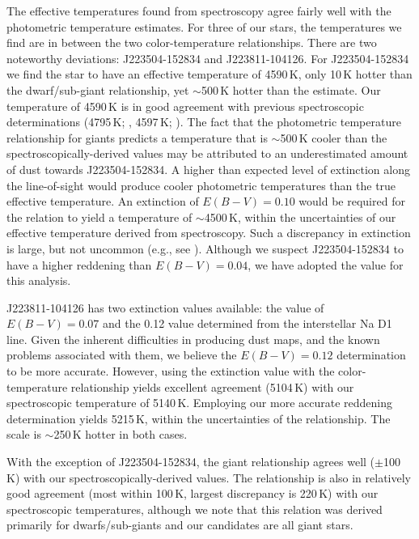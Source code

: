 \documentclass{emulateapj}
\begin{document}
The effective temperatures found from spectroscopy agree fairly well with the photometric temperature estimates. For three of our stars, the temperatures we find are in between the two color-temperature relationships. There are two noteworthy deviations: J223504-152834 and J223811-104126. For J223504-152834 we find the star to have an effective temperature of 4590\,K, only 10\,K hotter than the \citet{casagrande;et-al_2010} dwarf/sub-giant relationship, yet ${\sim}$500\,K hotter than the \citet{alonso;et-al_1999} estimate. Our temperature of 4590\,K is in good agreement with previous spectroscopic determinations (4795\,K; \citet{williams;et-al_2011}, 4597\,K; \citet{wylie-de-boer;et-al_2012}). The fact that the \citet{alonso;et-al_1999} photometric temperature relationship for giants predicts a temperature that is ${\sim}$500\,K cooler than the spectroscopically-derived values may be attributed to an underestimated amount of dust towards J223504-152834. A higher than expected level of extinction along the line-of-sight would produce cooler photometric temperatures than the true effective temperature.  An extinction of $E(B-V) = 0.10$ would be required for the \citet{alonso;et-al_1999} relation to yield a temperature of ${\sim}$4500\,K, within the uncertainties of our effective temperature derived from spectroscopy. Such a discrepancy in extinction is large, but not uncommon (e.g., see \citet{nataf;et-al}). Although we suspect J223504-152834 to have a higher reddening than $E(B-V) = 0.04$, we have adopted the \citet{schlegel;et-al_1998} value for this analysis.

J223811-104126 has two extinction values available: the \citet{schlegel;et-al_1998} value of $E(B-V) = 0.07$ and the 0.12 value  determined from the interstellar Na D1 line. Given the inherent difficulties in producing dust maps, and the known problems associated with them, we believe the $E(B-V) = 0.12$ determination to be more accurate. However, using the \citet{schlegel;et-al_1998} extinction value with the \citet{alonso;et-al_1999} color-temperature relationship yields excellent agreement (5104\,K) with our spectroscopic temperature of 5140\,K. Employing our more accurate reddening determination yields 5215\,K, within the uncertainties of the relationship. The \citet{casagrande;et-al_2010} scale is ${\sim}$250\,K hotter in both cases.

With the exception of J223504-152834, the \citet{alonso;et-al_1999} giant relationship agrees well ($\pm$100\,K) with our spectroscopically-derived values. The \citet{casagrande;et-al_2010} relationship is also in relatively good agreement (most within 100\,K, largest discrepancy is 220\,K) with our spectroscopic temperatures, although we note that this relation was derived primarily for dwarfs/sub-giants and our candidates are all giant stars.
\end{document}
